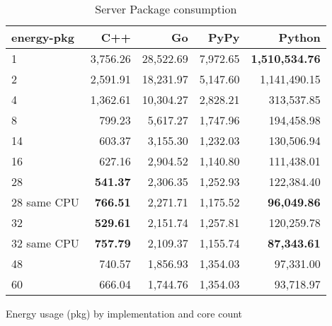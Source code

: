 \begin{table}
    \centering
    \begin{tabular}{lrrrr}
        \hline
        energy-pkg     & C++                & Go         & PyPy       & Python        \\
        \hline
        1              & 3,756.26            & 28,522.69   & 7,972.65   & \textbf{1,510,534.76}  \\
        2              & 2,591.91            & 18,231.97   & 5,147.60   & 1,141,490.15           \\
        4              & 1,362.61            & 10,304.27   & 2,828.21   &   313,537.85           \\
        8	             &   799.23 	         & 5,617.27    & 1,747.96   &	 194,458.98            \\ 
        14             &   603.37            & 3,155.30    & 1,232.03   &   130,506.94           \\
        16             &   627.16            & 2,904.52    & 1,140.80   &   111,438.01           \\
        28             &   \textbf{541.37}   & 2,306.35    & 1,252.93   &   122,384.40           \\
        28 same CPU    &   \textbf{766.51}   & 2,271.71    & 1,175.52   &   \textbf{96,049.86}   \\
        32             &   \textbf{529.61}   & 2,151.74    & 1,257.81   &   120,259.78           \\
        32 same CPU    &   \textbf{757.79}   & 2,109.37    & 1,155.74   &   \textbf{87,343.61}   \\
        48             &   740.57            & 1,856.93    & 1,354.03   &    97,331.00           \\
        60             &   666.04            & 1,744.76    & 1,354.03   &    93,718.97           \\
        \hline
    \end{tabular}
    \caption{Server Package consumption}{Energy usage (pkg) by implementation and core count}
\label{tab:server-energy-pkg}
\end{table}
